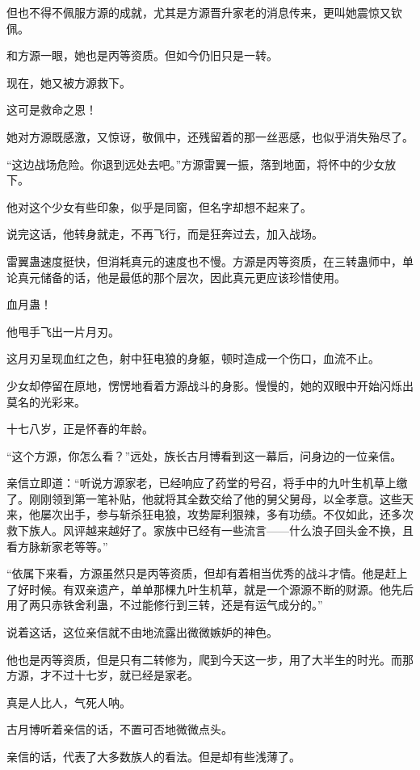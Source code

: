 \begin{this_body}
但也不得不佩服方源的成就，尤其是方源晋升家老的消息传来，更叫她震惊又钦佩。

和方源一眼，她也是丙等资质。但如今仍旧只是一转。

现在，她又被方源救下。

这可是救命之恩！

她对方源既感激，又惊讶，敬佩中，还残留着的那一丝恶感，也似乎消失殆尽了。

“这边战场危险。你退到远处去吧。”方源雷翼一振，落到地面，将怀中的少女放下。

他对这个少女有些印象，似乎是同窗，但名字却想不起来了。

说完这话，他转身就走，不再飞行，而是狂奔过去，加入战场。

雷翼蛊速度挺快，但消耗真元的速度也不慢。方源是丙等资质，在三转蛊师中，单论真元储备的话，他是最低的那个层次，因此真元更应该珍惜使用。

血月蛊！

他甩手飞出一片月刃。

这月刃呈现血红之色，射中狂电狼的身躯，顿时造成一个伤口，血流不止。

少女却停留在原地，愣愣地看着方源战斗的身影。慢慢的，她的双眼中开始闪烁出莫名的光彩来。

十七八岁，正是怀春的年龄。

“这个方源，你怎么看？”远处，族长古月博看到这一幕后，问身边的一位亲信。

亲信立即道：“听说方源家老，已经响应了药堂的号召，将手中的九叶生机草上缴了。刚刚领到第一笔补贴，他就将其全数交给了他的舅父舅母，以全孝意。这些天来，他屡次出手，参与斩杀狂电狼，攻势犀利狠辣，多有功绩。不仅如此，还多次救下族人。风评越来越好了。家族中已经有一些流言——什么浪子回头金不换，且看方脉新家老等等。”

“依属下来看，方源虽然只是丙等资质，但却有着相当优秀的战斗才情。他是赶上了好时候。有双亲遗产，单单那棵九叶生机草，就是一个源源不断的财源。他先后用了两只赤铁舍利蛊，不过能修行到三转，还是有运气成分的。”

说着这话，这位亲信就不由地流露出微微嫉妒的神色。

他也是丙等资质，但是只有二转修为，爬到今天这一步，用了大半生的时光。而那方源，才不过十七岁，就已经是家老。

真是人比人，气死人呐。

古月博听着亲信的话，不置可否地微微点头。

亲信的话，代表了大多数族人的看法。但是却有些浅薄了。


\end{this_body}
